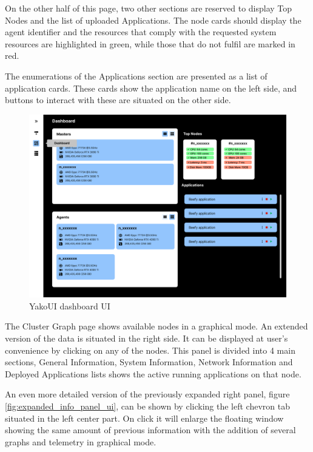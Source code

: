                 On the other half of this page, two other sections are reserved to display Top Nodes and the list of uploaded Applications. The node cards should display the agent identifier and the resources that comply with the requested system resources are highlighted in green, while those that do not fulfil are marked in red.
                
                The enumerations of the Applications section are presented as a list of application cards. These cards show the application name on the left side, and buttons to interact with these are situated on the other side.
                \begin{figure}[H]
                    \centering
                    \includegraphics[width=\linewidth]{Images/Frontend/UI/YakoUI Dashboard UI.png}
                    \caption{YakoUI dashboard UI}
                    \label{fig:dashboard_ui}
                \end{figure}
            
                The Cluster Graph page shows available nodes in a graphical mode. An extended version of the data is situated in the right side. It can be displayed at user's convenience by clicking on any of the nodes. This panel is divided into 4 main sections, General Information, System Information, Network Information and Deployed Applications lists shows the active running applications on that node.
                
                An even more detailed version of the previously expanded right panel, figure \ref{fig:expanded_info_panel_ui},  can be shown by clicking the left chevron tab situated in the left center part. On click it will enlarge the floating window showing the same amount of previous information with the addition of several graphs and telemetry in graphical mode.
            
